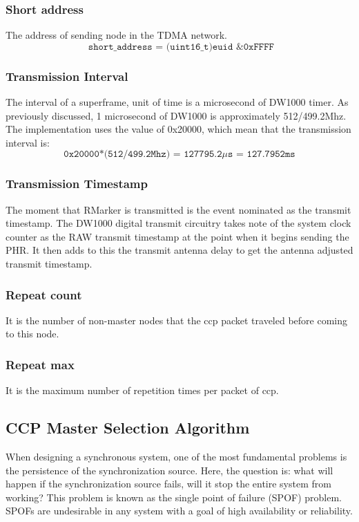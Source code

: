 \documentclass[\main/thesis.tex]{subfiles}
\begin{document}
\subsubsection{Short address}
The address of sending node in the TDMA network.
\begin{equation}
   \texttt{ short\_address = (uint16\_t)euid \& 0xFFFF}
\end{equation}

\subsubsection{Transmission Interval}
The interval of a superframe, unit of time is a microsecond of DW1000 timer. As previously discussed, 1 microsecond of DW1000 is approximately 512/499.2Mhz. The implementation uses the value of 0x20000, which mean that the transmission interval is:
\begin{equation}
    \texttt{0x20000*(512/499.2Mhz) = 127795.2$\mu$s = 127.7952ms}
\end{equation}

\subsubsection{Transmission Timestamp}
The moment that RMarker is transmitted is the event nominated as the transmit timestamp. The DW1000 digital transmit circuitry takes note of the system clock counter as the RAW transmit timestamp at the point when it begins sending the PHR. It then adds to this the transmit antenna delay to get the antenna adjusted transmit timestamp.

\subsubsection{Repeat count}
It is the number of non-master nodes that the ccp packet traveled before coming to this node.

\subsubsection{Repeat max}
It is the maximum number of repetition times per packet of ccp.

\subsection{CCP Master Selection Algorithm}

When designing a synchronous system, one of the most fundamental problems is the persistence of the synchronization source. Here, the question is: what will happen if the synchronization source fails, will it stop the entire system from working? This problem is known as the single point of failure (SPOF) problem. SPOFs are undesirable in any system with a goal of high availability or reliability.
\end{document}
